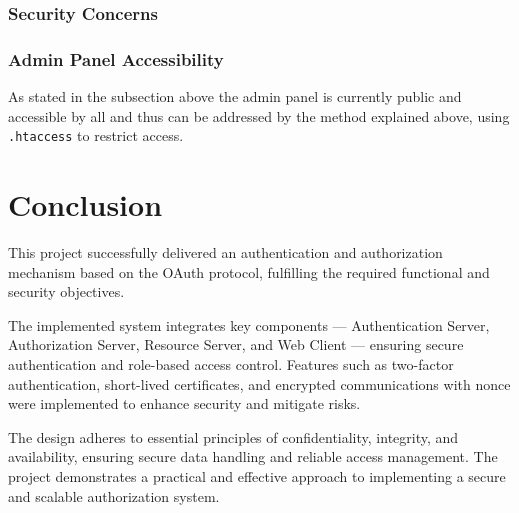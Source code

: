 \documentclass[10pt]{article}
\begin{document}
\subsubsection{Security Concerns}

\subsubsection* {Admin Panel Accessibility}

As stated in the subsection above the admin panel is currently public and accessible by all and thus can be addressed by the method explained above, using \texttt{.htaccess} to restrict access.

\section{Conclusion}

This project successfully delivered an authentication and authorization mechanism based on the OAuth protocol, fulfilling the required functional and security objectives. 

The implemented system integrates key components — Authentication Server, Authorization Server, Resource Server, and Web Client — ensuring secure authentication and role-based access control. Features such as two-factor authentication, short-lived certificates, and encrypted communications with nonce were implemented to enhance security and mitigate risks.

The design adheres to essential principles of confidentiality, integrity, and availability, ensuring secure data handling and reliable access management. The project demonstrates a practical and effective approach to implementing a secure and scalable authorization system.
\end{document}
